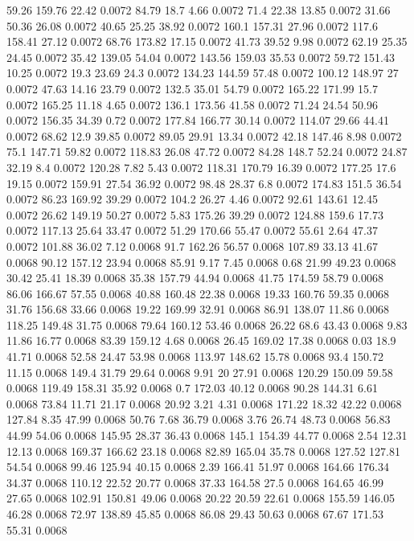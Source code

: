 59.26	159.76	22.42	0.0072
84.79	18.7	4.66	0.0072
71.4	22.38	13.85	0.0072
31.66	50.36	26.08	0.0072
40.65	25.25	38.92	0.0072
160.1	157.31	27.96	0.0072
117.6	158.41	27.12	0.0072
68.76	173.82	17.15	0.0072
41.73	39.52	9.98	0.0072
62.19	25.35	24.45	0.0072
35.42	139.05	54.04	0.0072
143.56	159.03	35.53	0.0072
59.72	151.43	10.25	0.0072
19.3	23.69	24.3	0.0072
134.23	144.59	57.48	0.0072
100.12	148.97	27	0.0072
47.63	14.16	23.79	0.0072
132.5	35.01	54.79	0.0072
165.22	171.99	15.7	0.0072
165.25	11.18	4.65	0.0072
136.1	173.56	41.58	0.0072
71.24	24.54	50.96	0.0072
156.35	34.39	0.72	0.0072
177.84	166.77	30.14	0.0072
114.07	29.66	44.41	0.0072
68.62	12.9	39.85	0.0072
89.05	29.91	13.34	0.0072
42.18	147.46	8.98	0.0072
75.1	147.71	59.82	0.0072
118.83	26.08	47.72	0.0072
84.28	148.7	52.24	0.0072
24.87	32.19	8.4	0.0072
120.28	7.82	5.43	0.0072
118.31	170.79	16.39	0.0072
177.25	17.6	19.15	0.0072
159.91	27.54	36.92	0.0072
98.48	28.37	6.8	0.0072
174.83	151.5	36.54	0.0072
86.23	169.92	39.29	0.0072
104.2	26.27	4.46	0.0072
92.61	143.61	12.45	0.0072
26.62	149.19	50.27	0.0072
5.83	175.26	39.29	0.0072
124.88	159.6	17.73	0.0072
117.13	25.64	33.47	0.0072
51.29	170.66	55.47	0.0072
55.61	2.64	47.37	0.0072
101.88	36.02	7.12	0.0068
91.7	162.26	56.57	0.0068
107.89	33.13	41.67	0.0068
90.12	157.12	23.94	0.0068
85.91	9.17	7.45	0.0068
0.68	21.99	49.23	0.0068
30.42	25.41	18.39	0.0068
35.38	157.79	44.94	0.0068
41.75	174.59	58.79	0.0068
86.06	166.67	57.55	0.0068
40.88	160.48	22.38	0.0068
19.33	160.76	59.35	0.0068
31.76	156.68	33.66	0.0068
19.22	169.99	32.91	0.0068
86.91	138.07	11.86	0.0068
118.25	149.48	31.75	0.0068
79.64	160.12	53.46	0.0068
26.22	68.6	43.43	0.0068
9.83	11.86	16.77	0.0068
83.39	159.12	4.68	0.0068
26.45	169.02	17.38	0.0068
0.03	18.9	41.71	0.0068
52.58	24.47	53.98	0.0068
113.97	148.62	15.78	0.0068
93.4	150.72	11.15	0.0068
149.4	31.79	29.64	0.0068
9.91	20	27.91	0.0068
120.29	150.09	59.58	0.0068
119.49	158.31	35.92	0.0068
0.7	172.03	40.12	0.0068
90.28	144.31	6.61	0.0068
73.84	11.71	21.17	0.0068
20.92	3.21	4.31	0.0068
171.22	18.32	42.22	0.0068
127.84	8.35	47.99	0.0068
50.76	7.68	36.79	0.0068
3.76	26.74	48.73	0.0068
56.83	44.99	54.06	0.0068
145.95	28.37	36.43	0.0068
145.1	154.39	44.77	0.0068
2.54	12.31	12.13	0.0068
169.37	166.62	23.18	0.0068
82.89	165.04	35.78	0.0068
127.52	127.81	54.54	0.0068
99.46	125.94	40.15	0.0068
2.39	166.41	51.97	0.0068
164.66	176.34	34.37	0.0068
110.12	22.52	20.77	0.0068
37.33	164.58	27.5	0.0068
164.65	46.99	27.65	0.0068
102.91	150.81	49.06	0.0068
20.22	20.59	22.61	0.0068
155.59	146.05	46.28	0.0068
72.97	138.89	45.85	0.0068
86.08	29.43	50.63	0.0068
67.67	171.53	55.31	0.0068
